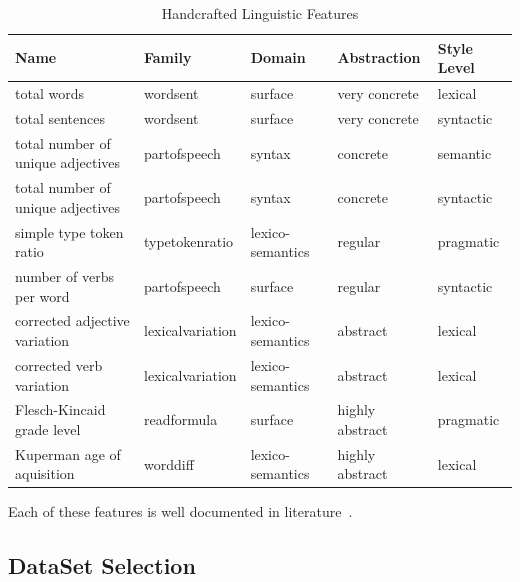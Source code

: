\documentclass[runningheads,a4paper,11pt]{article}
\begin{document}
\begin{table}[ht]
    \setlength\tabcolsep{6pt}
    \centering
    \begin{tabular}{@{}lllll@{}}
        \toprule
        Name                              & Family           & Domain           & Abstraction     & Style Level\footnotemark \\ \toprule
        total words                       & wordsent         & surface          & very concrete   & lexical                  \\
        total sentences                   & wordsent         & surface          & very concrete   & syntactic                \\ \bottomrule
        total number of unique adjectives & partofspeech     & syntax           & concrete        & semantic                 \\
        total number of unique adjectives & partofspeech     & syntax           & concrete        & syntactic                \\ \bottomrule
        simple type token ratio           & typetokenratio   & lexico-semantics & regular         & pragmatic                \\
        number of verbs per word          & partofspeech     & surface          & regular         & syntactic                \\ \bottomrule
        corrected adjective variation     & lexicalvariation & lexico-semantics & abstract        & lexical                  \\
        corrected verb variation          & lexicalvariation & lexico-semantics & abstract        & lexical                  \\ \bottomrule
        Flesch-Kincaid grade level        & readformula      & surface          & highly abstract & pragmatic                \\
        Kuperman age of aquisition        & worddiff         & lexico-semantics & highly abstract & lexical                  \\ \bottomrule
    \end{tabular}
    \caption{Handcrafted Linguistic Features}\label{table-hlf}
\end{table}

Each of these features is well documented in literature~\cite{lftk-2023}.

\subsection{DataSet Selection}\label{ds-selection}
\end{document}
